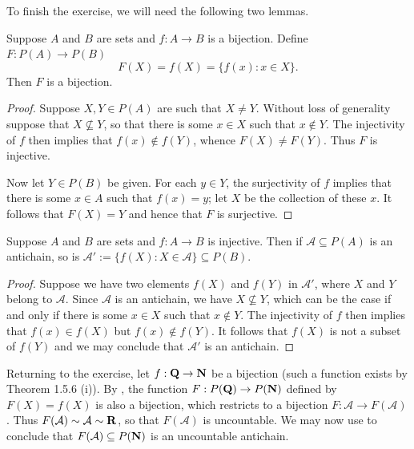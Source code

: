 \documentclass{lew98_solutions}
\begin{document}
\begin{solution}
\begin{enumerate}
        To finish the exercise, we will need the following two lemmas.
        \begin{lemma}
        \label{lem:ex1.6.10_1}
            Suppose \( A \) and \( B \) are sets and \( f : A \to B \) is a bijection. Define \( F : P(A) \to P(B) \)
            \[
                F(X) = f(X) = \{ f(x) : x \in X \}.
            \]
            Then \( F \) is a bijection.
        \end{lemma}

        \begin{proof}
            Suppose \( X, Y \in P(A) \) are such that \( X \neq Y \). Without loss of generality suppose that \( X \not\subseteq Y \), so that there is some \( x \in X \) such that \( x \not\in Y \). The injectivity of \( f \) then implies that \( f(x) \not\in f(Y) \), whence \( F(X) \neq F(Y) \). Thus \( F \) is injective.

            Now let \( Y \in P(B) \) be given. For each \( y \in Y \), the surjectivity of \( f \) implies that there is some \( x \in A \) such that \( f(x) = y \); let \( X \) be the collection of these \( x \). It follows that \( F(X) = Y \) and hence that \( F \) is surjective.
        \end{proof}

        \begin{lemma}
        \label{lem:ex1.6.10_2}
            Suppose \( A \) and \( B \) are sets and \( f : A \to B \) is injective. Then if \( \mathcal{A} \subseteq P(A) \) is an antichain, so is \( \mathcal{A}' := \{ f(X) : X \in \mathcal{A} \} \subseteq P(B) \).
        \end{lemma}

        \begin{proof}
            Suppose we have two elements \( f(X) \) and \( f(Y) \) in \( \mathcal{A}' \), where \( X \) and \( Y \) belong to \( \mathcal{A} \). Since \( \mathcal{A} \) is an antichain, we have \( X \not\subseteq Y \), which can be the case if and only if there is some \( x \in X \) such that \( x \not\in Y \). The injectivity of \( f \) then implies that \( f(x) \in f(X) \) but \( f(x) \not\in f(Y) \). It follows that \( f(X) \) is not a subset of \( f(Y) \) and we may conclude that \( \mathcal{A}' \) is an antichain.
        \end{proof}
        Returning to the exercise, let \( f : \mathbf{Q} \to \mathbf{N} \) be a bijection (such a function exists by Theorem 1.5.6 (i)). By , the function \( F : P(\mathbf{Q}) \to P(\mathbf{N}) \) defined by \( F(X) = f(X) \) is also a bijection, which restricts to a bijection \( F : \mathcal{A} \to F(\mathcal{A}) \). Thus \( F(\mathcal{A}) \sim \mathcal{A} \sim \mathbf{R} \), so that \( F(\mathcal{A}) \) is uncountable. We may now use  to conclude that \( F(\mathcal{A}) \subseteq P(\mathbf{N}) \) is an uncountable antichain.
    \end{enumerate}
\end{solution}
\end{document}

